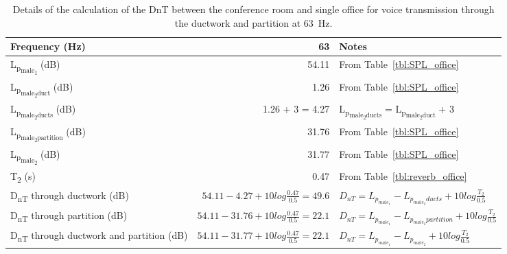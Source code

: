 \begin{sidewaystable}[htbp]
	\caption{Details of the calculation of the DnT between the conference room and single office for voice transmission through the ductwork and partition at 63~Hz.}
	\label{tbl:DnT_example}
	\centering
	\begin{tabular}{@{}lrl@{}}
		\toprule
		Frequency (Hz) & 63 & Notes \\ \midrule
		L\textsubscript{p\textsubscript{male\textsubscript{1}}} (dB) & 54.11 & From Table~\ref{tbl:SPL_office} \\
		L\textsubscript{p\textsubscript{male\textsubscript{2}duct}} (dB) & 1.26 & From Table~\ref{tbl:SPL_office} \\
		L\textsubscript{p\textsubscript{male\textsubscript{2}ducts}} (dB) & 1.26 + 3 = 4.27 & L\textsubscript{p\textsubscript{male\textsubscript{2}ducts}} = L\textsubscript{p\textsubscript{male\textsubscript{2}duct}} + 3 \\
		L\textsubscript{p\textsubscript{male\textsubscript{2}partition}} (dB) & 31.76 & From Table~\ref{tbl:SPL_office} \\
		L\textsubscript{p\textsubscript{male\textsubscript{2}}} (dB) & 31.77 & From Table~\ref{tbl:SPL_office} \\
		T\textsubscript{2} (s) & 0.47 & From Table~\ref{tbl:reverb_office} \\
		D\textsubscript{nT} through ductwork (dB) & $54.11 - 4.27 + 10 log \frac{0.47}{0.5} = 49.6$ & $D_{nT} = L_{p_{male_1}} - L_{p_{male_2}ducts} + 10 log \frac{T_2}{0.5}$ \\
		D\textsubscript{nT} through partition (dB) & $54.11 - 31.76 + 10 log \frac{0.47}{0.5} = 22.1$ & $D_{nT} = L_{p_{male_1}} - L_{p_{male_2}partition} + 10 log \frac{T_2}{0.5}$ \\
		D\textsubscript{nT} through ductwork and partition (dB) & $54.11 - 31.77 + 10 log \frac{0.47}{0.5} = 22.1$ & $D_{nT} = L_{p_{male_1}} - L_{p_{male_2}} + 10 log \frac{T_2}{0.5}$ \\ \bottomrule
	\end{tabular}
\end{sidewaystable}